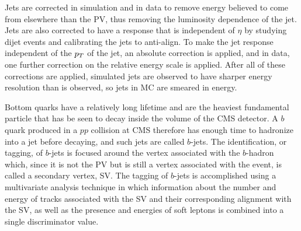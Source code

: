  Jets are corrected in simulation and in data to remove
  energy believed to come from elsewhere than the PV,
  thus removing the luminosity dependence of the jet.
 Jets are also corrected to have a response that is
  independent of $\eta$ by studying dijet events
  and calibrating the jets to anti-align.
 To make the jet response independent of the $p_T$
  of the jet, an absolute correction is applied,
  and in data, one further correction on the relative
  energy scale is applied.
 After all of these corrections are applied,
  simulated jets are observed to have
  sharper energy resolution than is observed,
  so jets in MC are smeared in energy.

 Bottom quarks have a relatively long lifetime
  and are the heaviest fundamental particle
  that has be seen to decay inside the volume of the CMS detector.
 A $b$ quark produced in a $pp$ collision at CMS
  therefore has enough time to hadronize into a jet before
  decaying, and such jets are called $b$-jets.
 The identification, or tagging, of $b$-jets is focused around
  the vertex associated with the $b$-hadron which,
  since it is not the PV but is still a vertex associated
  with the event, is called a secondary vertex, SV.
 The tagging of $b$-jets is accomplished using a multivariate
  analysis technique in which information about
  the number and energy of tracks associated
  with the SV and their corresponding alignment
  with the SV, as well as the presence and energies of
  soft leptons is combined into a single discriminator value.



